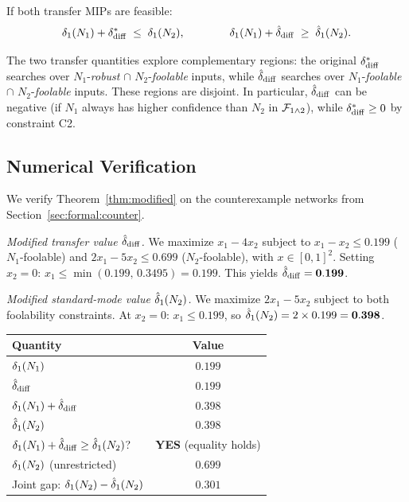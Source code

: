 \begin{corollary}
  \label{cor:sandwich}
  If both transfer MIPs are feasible:
  \[
    \delta_1(N_{1})+\delta_{\mathrm{diff}}^{*}
    \;\leq\;
    \delta_1(N_{2}),
    \qquad\qquad
    \delta_1(N_{1})+\hat{\delta}_{\mathrm{diff}}
    \;\geq\;
    \hat{\delta}_1(N_{2}).
  \]
\end{corollary}

\begin{remark}
  The two transfer quantities explore complementary regions: the original $\delta_{\mathrm{diff}}^{*}$ searches over $N_1$-\emph{robust} $\cap$ $N_2$-\emph{foolable} inputs, while $\hat{\delta}_{\mathrm{diff}}$ searches over $N_1$-\emph{foolable} $\cap$ $N_2$-\emph{foolable} inputs. These regions are disjoint. In particular, $\hat{\delta}_{\mathrm{diff}}$ can be negative (if $N_1$ always has higher confidence than $N_2$ in $\mathcal{F}_{1\wedge 2}$), while $\delta_{\mathrm{diff}}^{*} \geq 0$ by constraint C2.
\end{remark}

\subsection{Numerical Verification}
\label{sec:formal:numerical}

We verify Theorem~\ref{thm:modified} on the counterexample networks from Section~\ref{sec:formal:counter}.

\emph{Modified transfer value $\hat{\delta}_{\mathrm{diff}}$.} We maximize $x_1-4x_2$ subject to $x_1-x_2\leq 0.199$ ($N_1$-foolable) and $2x_1-5x_2\leq 0.699$ ($N_2$-foolable), with $x\in[0,1]^2$. Setting $x_2=0$: $x_1\leq\min(0.199,\,0.3495)=0.199$. This yields $\hat{\delta}_{\mathrm{diff}} = \mathbf{0.199}$.

\emph{Modified standard-mode value $\hat{\delta}_1(N_{2})$.} We maximize $2x_1-5x_2$ subject to both foolability constraints. At $x_2=0$: $x_1\leq 0.199$, so $\hat{\delta}_1(N_{2})=2\times 0.199=\mathbf{0.398}$.

\begin{center}
\renewcommand{\arraystretch}{1.5}
\begin{tabular}{lc}
\toprule
Quantity & Value \\
\midrule
$\delta_1(N_{1})$ & $0.199$ \\
$\hat{\delta}_{\mathrm{diff}}$ & $0.199$ \\
$\delta_1(N_{1})+\hat{\delta}_{\mathrm{diff}}$ & $\mathbf{0.398}$ \\
\midrule
$\hat{\delta}_1(N_{2})$ & $\mathbf{0.398}$ \\
\midrule
$\delta_1(N_{1})+\hat{\delta}_{\mathrm{diff}}\geq\hat{\delta}_1(N_{2})$? & \textbf{YES} (equality holds) \\
\midrule\midrule
$\delta_1(N_{2})$ (unrestricted) & $0.699$ \\
Joint gap: $\delta_1(N_{2})-\hat{\delta}_1(N_{2})$ & $0.301$ \\
\bottomrule
\end{tabular}
\end{center}

